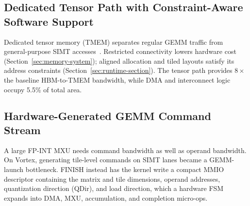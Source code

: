 \documentclass[sigconf,anonymous,nonacm]{acmart}
\newcommand{\fpint}{FP-INT}
\begin{document}
\subsection{Dedicated Tensor Path with Constraint-Aware Software Support}
Dedicated tensor memory (TMEM) separates regular GEMM traffic from general-purpose SIMT accesses~\cite{dissecting_hopper,virgo}. Restricted connectivity lowers hardware cost (Section~\ref{sec:memory-system}); aligned allocation and tiled layouts satisfy its address constraints (Section~\ref{sec:runtime-section}). The tensor path provides $8\times$ the baseline HBM-to-TMEM bandwidth, while DMA and interconnect logic occupy 5.5\% of total area.

\subsection{Hardware-Generated GEMM Command Stream}
A large \fpint{} MXU needs command bandwidth as well as operand bandwidth. 
On Vortex, generating tile-level commands on SIMT lanes became a GEMM-launch bottleneck. 
FINISH instead has the kernel write a compact MMIO descriptor containing the matrix and tile dimensions, operand addresses, quantization direction (QDir), and load direction, which a hardware FSM expands into DMA, MXU, accumulation, and completion micro-ops.
\end{document}
